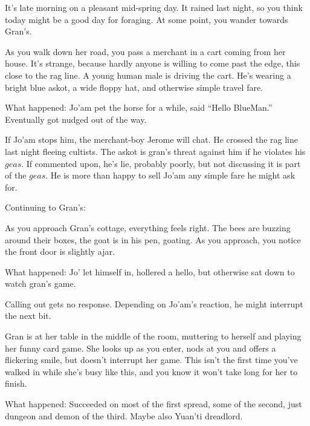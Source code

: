 \begin{multicols}{2}
  \begin{aloud}
  It's late morning on a pleasant mid-spring day.
  It rained last night, so you think today might be a good day for foraging.
  At some point, you wander towards Gran's.

  As you walk down her road, you pass a merchant in a cart coming from her house.
  It's strange, because hardly anyone is willing to come past the edge, this close to the rag line.
  A young human male is driving the cart.
  He's wearing a bright blue askot, a wide floppy hat, and otherwise simple travel fare.

  What happened: Jo'am pet the horse for a while, said ``Hello BlueMan.''
  Eventually got nudged out of the way.
  \end{aloud}

If Jo'am stops him, the merchant-boy Jerome will chat.
He crossed the rag line last night fleeing cultists.
The askot is gran's threat against him if he violates his $geas$.
If commented upon, he's lie, probably poorly, but not discussing it is part of the $geas$.
He is more than happy to sell Jo'am any simple fare he might ask for.


Continuing to Gran's:

  \begin{aloud}
  As you approach Gran's cottage, everything feels right.
  The bees are buzzing around their boxes, the goat is in his pen, goating.
  As you approach, you notice the front door is slightly ajar.

  What happened: Jo' let himself in, hollered a hello, but otherwise sat down to watch gran's game.
  \end{aloud}

Calling out gets no response.
Depending on Jo'am's reaction, he might interrupt the next bit.

  \begin{aloud}
  Gran is at her table in the middle of the room, muttering to herself and playing her
    funny card game.
  She looks up as you enter, nods at you and offers a flickering smile, but doesn't interrupt
    her game.
  This isn't the first time you've walked in while she's busy like this, and you know it won't
    take long for her to finish.

  What happened: Succeeded on most of the first spread, some of the second,
    just dungeon and demon of the third.  Maybe also Yuan'ti dreadlord.
  \end{aloud}


\end{multicols}
